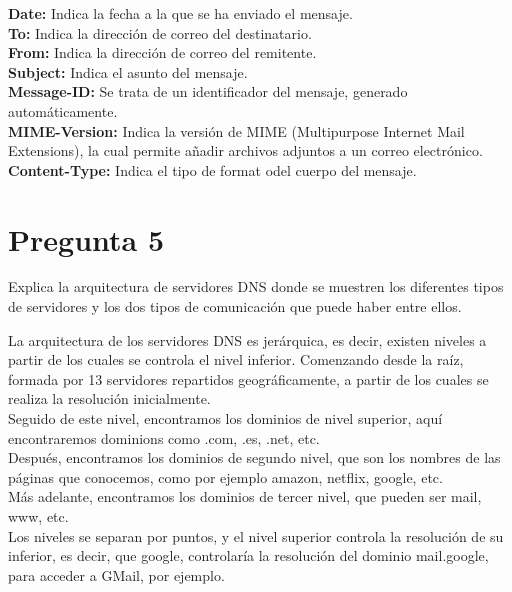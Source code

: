 \documentclass[spanish]{article}
\begin{document}
\textbf{Date:} Indica la fecha a la que se ha enviado el
mensaje.\\

\textbf{To:} Indica la dirección de correo del
destinatario.\\

\textbf{From:} Indica la dirección de correo del
remitente.\\

\textbf{Subject:} Indica el asunto del mensaje.\\

\textbf{Message-ID:} Se trata de un identificador del
mensaje, generado automáticamente.\\

\textbf{MIME-Version:} Indica la versión de MIME
(Multipurpose Internet Mail Extensions), la cual permite
añadir archivos adjuntos a un correo electrónico.\\

\textbf{Content-Type:} Indica el tipo de format odel cuerpo
del mensaje.

\section{Pregunta 5}

Explica la arquitectura de servidores DNS donde se muestren
los diferentes tipos de servidores y los dos tipos de
comunicación que puede haber entre ellos.

La arquitectura de los servidores DNS es jerárquica, es
decir, existen niveles a partir de los cuales se controla el
nivel inferior. Comenzando desde la raíz, formada por 13
servidores repartidos geográficamente, a partir de los
cuales se realiza la resolución inicialmente.\\

Seguido de este nivel, encontramos los dominios de nivel
superior, aquí encontraremos dominions como .com, .es, .net,
etc.\\

Después, encontramos los dominios de segundo nivel, que son
los nombres de las páginas que conocemos, como por ejemplo
amazon, netflix, google, etc.\\

Más adelante, encontramos los dominios de tercer nivel, que
pueden ser mail, www, etc.\\

Los niveles se separan por puntos, y el nivel superior
controla la resolución de su inferior, es decir, que google,
controlaría la resolución del dominio mail.google, para
acceder a GMail, por ejemplo.\\
\end{document}
